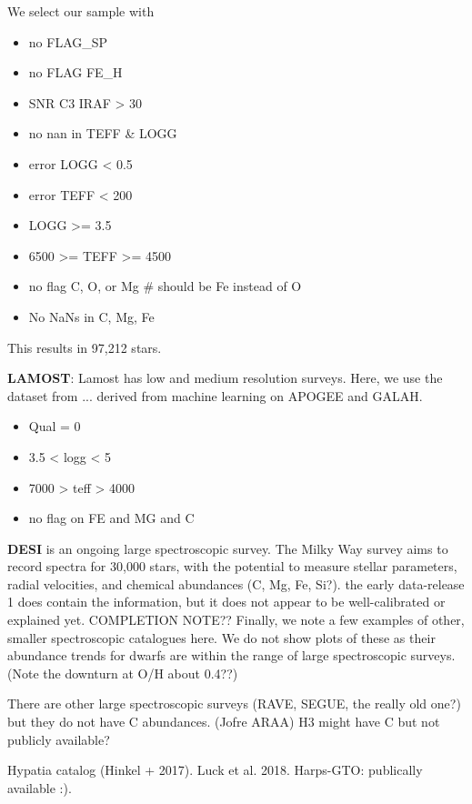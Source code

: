 \documentclass[11pt]{article}
\begin{document}
We select our sample with
\begin{itemize}
    \item no FLAG\_SP
    \item no FLAG FE\_H
    \item SNR C3 IRAF > 30
    \item no nan in TEFF \& LOGG
    \item error LOGG < 0.5
    \item error TEFF < 200
    \item LOGG >= 3.5
    \item 6500 >= TEFF >= 4500
    \item no flag C, O, or Mg \# should be Fe instead of O
    \item No NaNs in C, Mg, Fe
\end{itemize}
This results in 97,212 stars.


\textbf{LAMOST}: Lamost has low and medium resolution surveys. Here, we use the dataset from ... derived from machine learning on APOGEE and GALAH.

\begin{itemize}
    \item Qual = 0
    \item 3.5 < logg < 5
    \item 7000 > teff > 4000
    \item no flag on FE and MG and C 
\end{itemize}





\textbf{DESI} is an ongoing large spectroscopic survey. The Milky Way survey aims to record spectra for 30,000 stars, with the potential to measure stellar parameters, radial velocities, and chemical abundances (C, Mg, Fe, Si?). the early data-release 1 does contain the information, but it does not appear to be well-calibrated or explained yet. 
COMPLETION NOTE??
Finally, we note a few examples of other, smaller spectroscopic catalogues here. We do not show plots of these as their abundance trends for dwarfs are within the range of large spectroscopic surveys. (Note the downturn at O/H about 0.4??)

There are other large spectroscopic surveys (RAVE, SEGUE, the really old one?)  but they do not have C abundances. (Jofre ARAA)
H3 might have C but not publicly available?

\citet{bensby+21}

Hypatia catalog (Hinkel + 2017).
 Luck et al. 2018.
Harps-GTO: publically available :).
\end{document}
